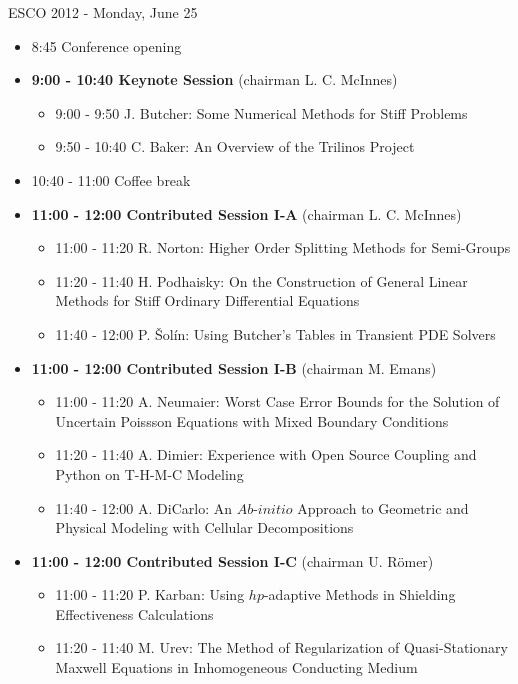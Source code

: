 \documentclass[10pt, A4]{article}%
\begin{document}
\centerline{\huge ESCO 2012 - Monday, June 25}
\vspace{4mm}

\begin{itemize}    
  \item 8:45 Conference opening
  \item {\bf 9:00 - 10:40 Keynote Session} (chairman L. C. McInnes) 
  \begin{itemize}
    \item 9:00 - 9:50 J. Butcher: Some Numerical Methods for Stiff Problems
    \item 9:50 - 10:40 C. Baker: An Overview of the Trilinos Project
  \end{itemize}
  \item 10:40 - 11:00 Coffee break
  \item {\bf 11:00 - 12:00 Contributed Session I-A} (chairman L. C. McInnes) 
  \begin{itemize}
    \item 11:00 - 11:20 R. Norton: Higher Order Splitting Methods for Semi-Groups
    \item 11:20 - 11:40 H. Podhaisky: On the Construction of General Linear Methods for Stiff Ordinary Differential Equations
    \item 11:40 - 12:00 P. \v{S}ol\'{i}n: Using Butcher's Tables in Transient PDE Solvers
  \end{itemize}
  \item {\bf 11:00 - 12:00 Contributed Session I-B} (chairman M. Emans) 
  \begin{itemize}
    \item 11:00 - 11:20 A. Neumaier: Worst Case Error Bounds for the Solution of Uncertain Poissson Equations with Mixed Boundary Conditions
    \item 11:20 - 11:40 A. Dimier: Experience with Open Source Coupling and Python on T-H-M-C Modeling
    \item 11:40 - 12:00 A. DiCarlo: An $Ab$-$initio$ Approach to Geometric and Physical Modeling with Cellular Decompositions 
  \end{itemize}
  \item {\bf 11:00 - 12:00 Contributed Session I-C} (chairman U. R\"{o}mer) 
  \begin{itemize}
	\item 11:00 - 11:20 P. Karban: Using $hp$-adaptive Methods in Shielding Effectiveness Calculations 
    \item 11:20 - 11:40 M. Urev: The Method of Regularization of Quasi-Stationary Maxwell Equations in Inhomogeneous Conducting Medium

\end{itemize}
\end{itemize}
\end{document}
